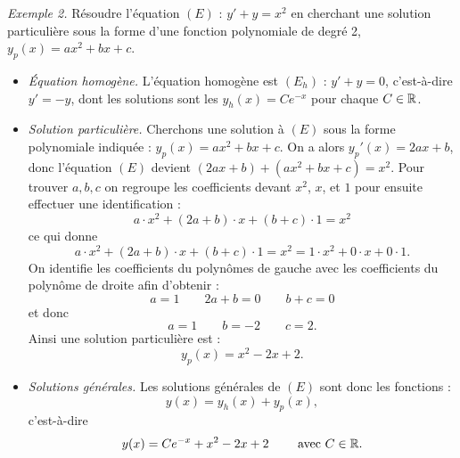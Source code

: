 \documentclass[11pt,class=report,crop=false]{standalone}
\begin{document}
\emph{Exemple 2.}
Résoudre l'équation $(E)$ : $y'+y = x^2$ en cherchant une solution particulière sous la forme d'une fonction polynomiale de degré 2, $y_p(x) = ax^2+bx+c$.
\begin{itemize}
  \item \emph{\'Equation homogène.} L'équation homogène est $(E_h)$ : $y'+y=0$, c'est-à-dire $y'=-y$, dont les solutions sont les $y_h(x) = Ce^{-x}$ pour chaque $C \in \mathbb{R}$.

  \item \emph{Solution particulière.} Cherchons une solution à $(E)$ sous la forme polynomiale indiquée : $y_p(x)=ax^2+bx+c$. On a alors $y_p'(x) = 2ax+b$, donc l'équation $(E)$ devient $(2ax+b)+(ax^2+bx+c)=x^2$. Pour trouver $a,b,c$ on regroupe les coefficients devant $x^2$, $x$, et $1$ pour ensuite effectuer une identification :
  $$a \cdot x^2 + (2a+b) \cdot x + (b+c) \cdot 1 = x^2$$
  ce qui donne 
  $$a \cdot x^2 + (2a+b) \cdot x + (b+c)\cdot 1 = x^2 = 1 \cdot x^2 + 0 \cdot x + 0 \cdot 1.$$
  On identifie les coefficients du polynômes de gauche avec les coefficients du polynôme de droite afin d'obtenir :
  $$a=1 \qquad 2a+b = 0 \qquad b+c = 0$$
  et donc 
  $$a = 1 \qquad b=-2 \qquad c = 2.$$
  Ainsi une solution particulière est :
$$y_p(x) = x^2-2x+2.$$
  

  \item \emph{Solutions générales.} Les solutions générales de $(E)$ sont donc 
 les fonctions  :
$$y(x) = y_h(x) + y_p(x),$$
c'est-à-dire
$$y(x) = Ce^{-x} + x^2-2x+2 \qquad \text{ avec } C \in \mathbb{R}.$$
\end{itemize}
\end{document}
